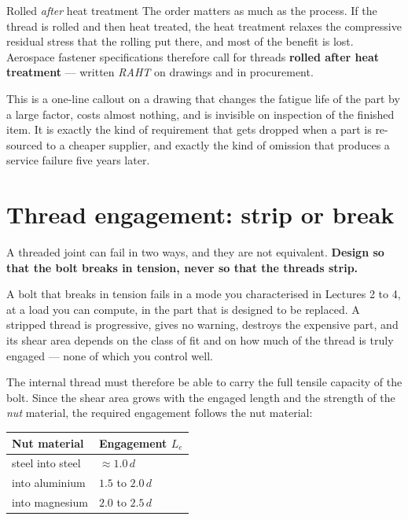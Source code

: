 \documentclass[11pt,a4paper]{article}
\begin{document}
\begin{keybox}{Rolled \emph{after} heat treatment}
The order matters as much as the process. If the thread is rolled and then heat treated, the heat
treatment relaxes the compressive residual stress that the rolling put there, and most of the benefit
is lost. Aerospace fastener specifications therefore call for threads \textbf{rolled after heat
treatment} --- written \emph{RAHT} on drawings and in procurement.

This is a one-line callout on a drawing that changes the fatigue life of the part by a large factor,
costs almost nothing, and is invisible on inspection of the finished item. It is exactly the kind of
requirement that gets dropped when a part is re-sourced to a cheaper supplier, and exactly the kind of
omission that produces a service failure five years later.
\end{keybox}

\section{Thread engagement: strip or break}\label{sec:engage}

A threaded joint can fail in two ways, and they are not equivalent. \textbf{Design so that the bolt
breaks in tension, never so that the threads strip.}

A bolt that breaks in tension fails in a mode you characterised in Lectures 2 to 4, at a load you can
compute, in the part that is designed to be replaced. A stripped thread is progressive, gives no
warning, destroys the expensive part, and its shear area depends on the class of fit and on how much
of the thread is truly engaged --- none of which you control well.

\medskip
The internal thread must therefore be able to carry the full tensile capacity of the bolt. Since the
shear area grows with the engaged length and the strength of the \emph{nut} material, the required
engagement follows the nut material:

\begin{center}\small
\begin{tabular}{@{}ll@{}}
\toprule
Nut material & Engagement $L_e$\\
\midrule
steel into steel & $\approx 1.0\,d$\\
into aluminium & $1.5$ to $2.0\,d$\\
into magnesium & $2.0$ to $2.5\,d$\\
\bottomrule
\end{tabular}
\end{center}
\end{document}
